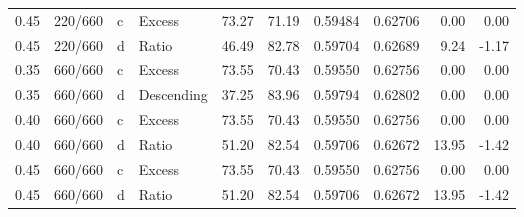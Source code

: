 \begin{table}[t]
\begin{tabular}{llllrrrrrr}
0.45 & 220/660 & c & Excess & 73.27 & 71.19 & 0.59484 & 0.62706 & 0.00 & 0.00 \\
0.45 & 220/660 & d & Ratio & 46.49 & 82.78 & 0.59704 & 0.62689 & 9.24 & -1.17 \\
0.35 & 660/660 & c & Excess & 73.55 & 70.43 & 0.59550 & 0.62756 & 0.00 & 0.00 \\
0.35 & 660/660 & d & Descending & 37.25 & 83.96 & 0.59794 & 0.62802 & 0.00 & 0.00 \\
0.40 & 660/660 & c & Excess & 73.55 & 70.43 & 0.59550 & 0.62756 & 0.00 & 0.00 \\
0.40 & 660/660 & d & Ratio & 51.20 & 82.54 & 0.59706 & 0.62672 & 13.95 & -1.42 \\
0.45 & 660/660 & c & Excess & 73.55 & 70.43 & 0.59550 & 0.62756 & 0.00 & 0.00 \\
0.45 & 660/660 & d & Ratio & 51.20 & 82.54 & 0.59706 & 0.62672 & 13.95 & -1.42 \\
\bottomrule\end{tabular}\end{table}
